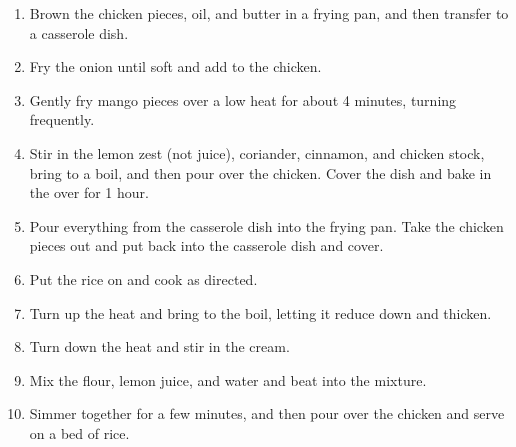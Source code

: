 \documentclass[12pt]{article}%
\newcommand{\tick}{\dotfill\(\ocircle\)}
\newcommand{\blue}[1]{\textcolor{blue!70!white}{#1}}
\begin{document}
\begin{enumerate}
    \item Brown the \blue{chicken} pieces, \blue{oil}, and \blue{butter} in a frying pan, and then transfer to a casserole dish.%
    \item Fry the \blue{onion} until soft and add to the chicken.%
    \item Gently fry \blue{mango} pieces over a low heat for about 4 minutes, turning frequently.%
    \item Stir in the \blue{lemon zest} (not juice), \blue{coriander}, \blue{cinnamon}, and \blue{chicken stock}, bring to a boil, and then pour over the chicken. Cover the dish and bake in the over for 1 hour.%
    \item Pour everything from the casserole dish into the frying pan. Take the chicken pieces out and put back into the casserole dish and cover.
    \item Put the \blue{rice} on and cook as directed.%
    \item Turn up the heat and bring to the boil, letting it reduce down and thicken.%
    \item Turn down the heat and stir in the \blue{cream}.%
    \item Mix the \blue{flour}, \blue{lemon juice}, and \blue{water} and beat into the mixture.%
    \item Simmer together for a few minutes, and then pour over the chicken and serve on a bed of rice.%
\end{enumerate}
\end{document}
